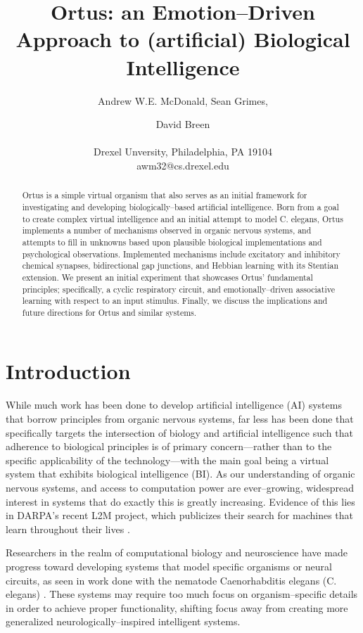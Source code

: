 \documentclass[letterpaper]{article}
\title{Ortus: an Emotion--Driven Approach to (artificial) Biological Intelligence}
\author{Andrew W.E. McDonald, Sean Grimes,\and David Breen \\
\mbox{}\\
Drexel Unversity, Philadelphia, PA 19104 \\
awm32@cs.drexel.edu} %
\begin{document}
\maketitle

\begin{abstract}
 Ortus is a simple virtual organism that also serves as an initial framework for investigating and developing biologically--based artificial intelligence. Born from a goal to create complex virtual intelligence and an initial attempt to model C. elegans, Ortus implements a number of mechanisms observed in organic nervous systems, and attempts to fill in unknowns based upon plausible biological implementations and psychological observations. Implemented mechanisms include excitatory and inhibitory chemical synapses, bidirectional gap junctions, and Hebbian learning with its Stentian extension. We present an initial experiment that showcases Ortus' fundamental principles; specifically, a cyclic respiratory circuit, and emotionally--driven associative learning with respect to an input stimulus. Finally, we discuss the implications and future directions for Ortus and similar systems.


\end{abstract}

\section{Introduction}


While much work has been done to develop artificial intelligence (AI) systems that borrow principles from organic nervous systems, far less has been done that specifically targets the intersection of biology and artificial intelligence such that adherence to biological principles is of primary concern---rather than to the specific applicability of the technology---with the main goal being a virtual system that exhibits biological intelligence (BI).
As our understanding of organic nervous systems, and access to computation power are ever--growing, widespread interest in systems that do exactly this is greatly increasing. Evidence of this lies in DARPA's recent L2M project, which publicizes their search for machines that learn throughout their lives \citep{darpa}.

Researchers in the realm of computational biology and neuroscience have made progress toward developing systems that model specific organisms or neural circuits, as seen in work done with the nematode Caenorhabditis elegans (C. elegans) \citep{Izquierdo2016}. These systems may require too much focus on organism--specific details in order to achieve proper functionality, shifting focus away from creating more generalized neurologically--inspired intelligent systems.
\end{document}
